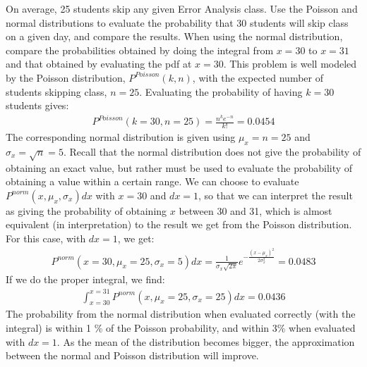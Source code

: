 \begin{example}{}{On average, 25 students skip any given Error Analysis class. Use the Poisson and normal distributions to evaluate the probability that 30 students will skip class on a given day, and compare the results. When using the normal distribution, compare the probabilities obtained by doing the integral from $x=30$ to $x=31$ and that obtained by evaluating the pdf at $x=30$.}{}
This problem is well modeled by the Poisson distribution, $P^{Poisson}(k,n)$, with the expected number of students skipping class, $n=25$. Evaluating the probability of having $k=30$ students gives:
\begin{align*}
P^{Poisson}(k=30,n=25)=\frac{n^k e^{-n}}{k!} =0.0454
\end{align*}
The corresponding normal distribution is given using $\mu_x=n=25$ and $\sigma_x=\sqrt{n}=5$. Recall that the normal distribution does not give the probability of obtaining an exact value, but rather must be used to evaluate the probability of obtaining a value within a certain range. We can choose to evaluate $P^{norm}(x,\mu_x,\sigma_x)dx$ with $x=30$ and $dx=1$, so that we can interpret the result as giving the probability of obtaining $x$ between 30 and 31, which is almost equivalent (in interpretation) to the result we get from the Poisson distribution. For this case, with $dx=1$, we get:
\begin{align*}
P^{norm}(x=30,\mu_x=25,\sigma_x=5)dx=\frac{1}{\sigma_x\sqrt{2\pi}}e^{-\frac{(x-\mu_x)^2}{2\sigma_x^2}}=0.0483
\end{align*}
If we do the proper integral, we find:
\begin{align*}
\int_{x=30}^{x=31}P^{norm}(x,\mu_x=25,\sigma_x=25)dx=0.0436
\end{align*}
The probability from the normal distribution when evaluated correctly (with the integral) is within 1 \% of the Poisson probability, and within 3\% when evaluated with $dx=1$. As the mean of the distribution becomes bigger, the approximation between the normal and Poisson distribution will improve.


\end{example}

